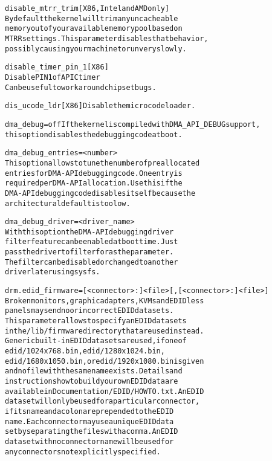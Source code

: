 \documentclass[a4paper,8pt,english]{sphinxmanual}
\begin{document}
\begin{alltt}
        disable\_mtrr\_trim {[}X86, Intel and AMD only{]}
                        By default the kernel will trim any uncacheable
                        memory out of your available memory pool based on
                        MTRR settings.  This parameter disables that behavior,
                        possibly causing your machine to run very slowly.

        disable\_timer\_pin\_1 {[}X86{]}
                        Disable PIN 1 of APIC timer
                        Can be useful to work around chipset bugs.

        dis\_ucode\_ldr   {[}X86{]} Disable the microcode loader.

        dma\_debug=off   If the kernel is compiled with DMA\_API\_DEBUG support,
                        this option disables the debugging code at boot.

        dma\_debug\_entries=\textless{}number\textgreater{}
                        This option allows to tune the number of preallocated
                        entries for DMA-API debugging code. One entry is
                        required per DMA-API allocation. Use this if the
                        DMA-API debugging code disables itself because the
                        architectural default is too low.

        dma\_debug\_driver=\textless{}driver\_name\textgreater{}
                        With this option the DMA-API debugging driver
                        filter feature can be enabled at boot time. Just
                        pass the driver to filter for as the parameter.
                        The filter can be disabled or changed to another
                        driver later using sysfs.

        drm.edid\_firmware={[}\textless{}connector\textgreater{}:{]}\textless{}file\textgreater{}{[},{[}\textless{}connector\textgreater{}:{]}\textless{}file\textgreater{}{]}
                        Broken monitors, graphic adapters, KVMs and EDIDless
                        panels may send no or incorrect EDID data sets.
                        This parameter allows to specify an EDID data sets
                        in the /lib/firmware directory that are used instead.
                        Generic built-in EDID data sets are used, if one of
                        edid/1024x768.bin, edid/1280x1024.bin,
                        edid/1680x1050.bin, or edid/1920x1080.bin is given
                        and no file with the same name exists. Details and
                        instructions how to build your own EDID data are
                        available in Documentation/EDID/HOWTO.txt. An EDID
                        data set will only be used for a particular connector,
                        if its name and a colon are prepended to the EDID
                        name. Each connector may use a unique EDID data
                        set by separating the files with a comma.  An EDID
                        data set with no connector name will be used for
                        any connectors not explicitly specified.


\end{alltt}
\end{document}
